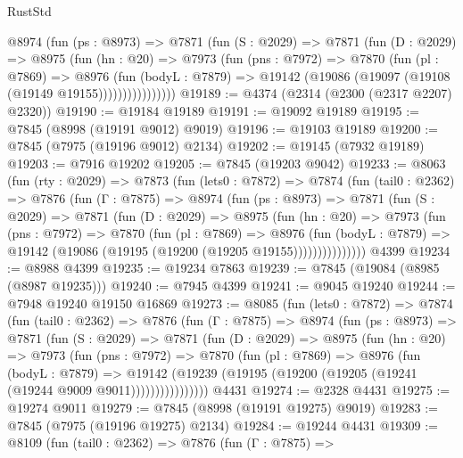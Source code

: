 \begin{lexlean}{RustStd}
\begin{coremodule}
            @8974
              (fun (ps : @8973) =>
              @7871
                (fun (S : @2029) =>
                @7871
                  (fun (D : @2029) =>
                  @8975
                    (fun (hn : @20) =>
                    @7973
                      (fun (pns : @7972) =>
                      @7870
                        (fun (pl : @7869) =>
                        @8976
                          (fun (bodyL : @7879) =>
                          @19142 (@19086 (@19097 (@19108 (@19149 @19155))))))))))))))))
@19189 := @4374 (@2314 (@2300 (@2317 @2207) @2320))
@19190 := @19184 @19189
@19191 := @19092 @19189
@19195 := @7845 (@8998 (@19191 @9012) @9019)
@19196 := @19103 @19189
@19200 := @7845 (@7975 (@19196 @9012) @2134)
@19202 := @19145 (@7932 @19189)
@19203 := @7916 @19202
@19205 := @7845 (@19203 @9042)
@19233 := @8063
    (fun (rty : @2029) =>
    @7873
      (fun (lets0 : @7872) =>
      @7874
        (fun (tail0 : @2362) =>
        @7876
          (fun (Γ : @7875) =>
          @8974
            (fun (ps : @8973) =>
            @7871
              (fun (S : @2029) =>
              @7871
                (fun (D : @2029) =>
                @8975
                  (fun (hn : @20) =>
                  @7973
                    (fun (pns : @7972) =>
                    @7870
                      (fun (pl : @7869) =>
                      @8976
                        (fun (bodyL : @7879) =>
                        @19142 (@19086 (@19195 (@19200 (@19205 @19155)))))))))))))))
    @4399
@19234 := @8988 @4399
@19235 := @19234 @7863
@19239 := @7845 (@19084 (@8985 (@8987 @19235)))
@19240 := @7945 @4399
@19241 := @9045 @19240
@19244 := @7948 @19240 @19150 @16869
@19273 := @8085
    (fun (lets0 : @7872) =>
    @7874
      (fun (tail0 : @2362) =>
      @7876
        (fun (Γ : @7875) =>
        @8974
          (fun (ps : @8973) =>
          @7871
            (fun (S : @2029) =>
            @7871
              (fun (D : @2029) =>
              @8975
                (fun (hn : @20) =>
                @7973
                  (fun (pns : @7972) =>
                  @7870
                    (fun (pl : @7869) =>
                    @8976
                      (fun (bodyL : @7879) =>
                      @19142
                        (@19239 (@19195 (@19200 (@19205 (@19241 (@19244 @9009 @9011))))))))))))))))
    @4431
@19274 := @2328 @4431
@19275 := @19274 @9011
@19279 := @7845 (@8998 (@19191 @19275) @9019)
@19283 := @7845 (@7975 (@19196 @19275) @2134)
@19284 := @19244 @4431
@19309 := @8109
    (fun (tail0 : @2362) =>
    @7876
      (fun (Γ : @7875) =>

\end{coremodule}
\end{lexlean}
